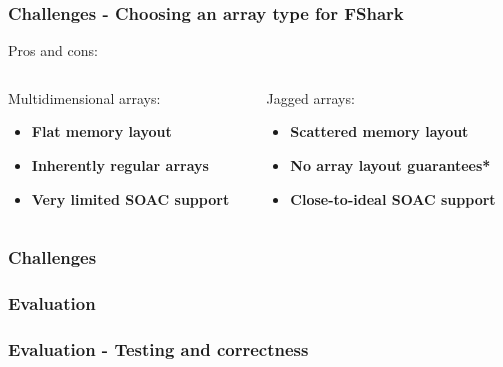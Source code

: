 \documentclass[10pt, compress, usenames, dvipsnames]{beamer}
\begin{document}
\begin{frame}[fragile]
  \frametitle{Challenges - Choosing an array type for FShark}
  Pros and cons:\\
  \begin{columns}
    \begin{column}{.48\textwidth}
      Multidimensional arrays:\\
      \begin{itemize}
      \item<1-> {\color{ForestGreen} \textbf{Flat memory layout}}
      \item<2-> {\color{ForestGreen} \textbf{Inherently regular arrays}}
      \item<3-> {\color{red} \textbf{Very limited SOAC support}}
      \end{itemize}
    \end{column}
    \begin{column}{.48\textwidth}
      Jagged arrays:\\
      \begin{itemize}
      \item<1-> {\color{red} \textbf{Scattered memory layout}}
      \item<2-> {\color{red} \textbf{No array layout guarantees*}} 
      \item<3-> {\color{ForestGreen} \textbf{Close-to-ideal SOAC support}}
      \end{itemize}
    \end{column}
  \end{columns}
\end{frame}

\begin{frame}[fragile]
  \frametitle{Challenges}
\end{frame}

\begin{frame}[fragile]
  \frametitle{Evaluation}
\end{frame}

\begin{frame}[fragile]
  \frametitle{Evaluation - Testing and correctness}

  


\end{frame}
\end{document}

